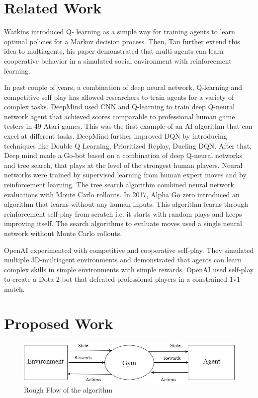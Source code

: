 \documentclass[conference]{IEEEtran}
\begin{document}
\section{Related Work}
Watkins\cite{sp1} introduced Q- learning as a simple way for training agents to learn
optimal policies for a Markov decision process. Then, Tan\cite{sp2} further extend
this idea to multiagents, his paper demonstrated that
multi-agents can learn cooperative behavior in a simulated social environment with reinforcement learning.

In past couple of years, a combination of deep neural network, Q-learning and
competitive self play has allowed researchers to train agents for a variety
of complex tasks. DeepMind\cite{sp3} used CNN and Q-learning to train deep Q-neural
network agent that achieved scores comparable to professional human game
testers in 49 Atari games. This was the first example of an AI algorithm
that can excel at different tasks. DeepMind further improved DQN by introducing
techniques like Double Q Learning\cite{sp4}, Prioritized Replay\cite{sp5}, Dueling DQN\cite{sp6}.  After
that, Deep mind made a Go-bot\cite{sp7} based on a combination of deep Q-neural
networks and tree search, that plays at the level of the strongest human
players. Neural networks were trained by supervised learning from human
expert moves and by reinforcement learning. The tree search algorithm
combined neural network evaluations with Monte Carlo rollouts. In 2017, Alpha
Go zero\cite{sp8} introduced an algorithm that learns without any human inputs.
This algorithm learns through reinforcement self-play from scratch i.e. it starts
 with random plays and keeps improving itself. The search algorithms to evaluate moves used a single
 neural network without Monte Carlo rollouts.

OpenAI experimented with competitive and cooperative self-play\cite{sp9}. They simulated
multiple 3D-multiagent environments and demonstrated that agents can learn
complex skills in simple environments with simple rewards. OpenAI\cite{sp10} used
self-play to create a Dota 2 bot that defeated professional players in a
constrained 1v1 match.

\section{Proposed Work}
\begin{figure}[h]

	\includegraphics[width=\linewidth]{flow.jpg}
	\caption{Rough Flow of the algorithm}

\end{figure}
\end{document}
